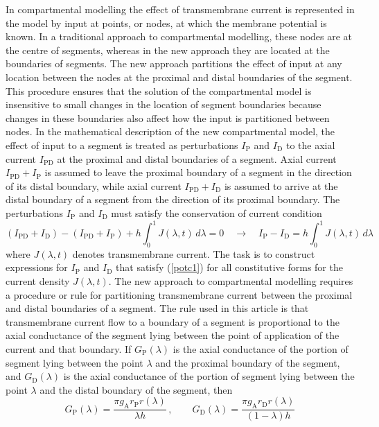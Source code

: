 In compartmental modelling the effect of transmembrane current is
represented in the model by input at points, or nodes, at which
the membrane potential is known. In a traditional approach to
compartmental modelling, these nodes are at the centre of
segments, whereas in the new approach they are located at the
boundaries of segments. The new approach partitions the effect of
input at any location between the nodes at the proximal and distal
boundaries of the segment. This procedure ensures that the
solution of the compartmental model is insensitive to small
changes in the location of segment boundaries because changes in
these boundaries also affect how the input is partitioned between
nodes. In the mathematical description of the new compartmental
model, the effect of input to a segment is treated as
perturbations $I_\mathrm{P}$ and $I_\mathrm{D}$ to the axial
current $I_\mathrm{PD}$ at the proximal and distal boundaries of a
segment. Axial current $I_\mathrm{PD}+I_\mathrm{P}$ is assumed to
leave the proximal boundary of a segment in the direction of its
distal boundary, while axial current $I_\mathrm{PD}+I_\mathrm{D}$
is assumed to arrive at the distal boundary of a segment from the
direction of its proximal boundary. The perturbations
$I_\mathrm{P}$ and $I_\mathrm{D}$ must satisfy the conservation of
current condition
\begin{equation}\label{potc1}
(I_\mathrm{PD}+I_\mathrm{D})-(I_\mathrm{PD}+I_\mathrm{P})+h\int_0^1
J(\lambda,t)\,d\lambda=0\quad\rightarrow\quad
I_\mathrm{P}-I_\mathrm{D}=h\int_0^1 J(\lambda,t)\,d\lambda
\end{equation}
where $J(\lambda,t)$ denotes transmembrane current. The task is to
construct expressions for $I_\mathrm{P}$ and $I_\mathrm{D}$ that
satisfy (\ref{potc1}) for all constitutive forms for the current
density $J(\lambda,t)$. The new approach to compartmental
modelling requires a procedure or rule for partitioning
transmembrane current between the proximal and distal boundaries
of a segment. The rule used in this article is that transmembrane
current flow to a boundary of a segment is proportional to the
axial conductance of the segment lying between the point of
application of the current and that boundary. If
$G_\mathrm{P}(\lambda)$ is the axial conductance of the portion of
segment lying between the point $\lambda$ and the proximal
boundary of the segment, and $G_\mathrm{D}(\lambda)$ is the axial
conductance of the portion of segment lying between the point
$\lambda$ and the distal boundary of the segment, then
\begin{equation}\label{potc2}
G_\mathrm{P}(\lambda) =
\frac{\pi g_\mathrm{A} r_\mathrm{P}r(\lambda)}{\lambda h}\,,\qquad
G_\mathrm{D}(\lambda) =
\frac{\pi g_\mathrm{A} r_\mathrm{D} r(\lambda)}{(1-\lambda)h}
\end{equation}
